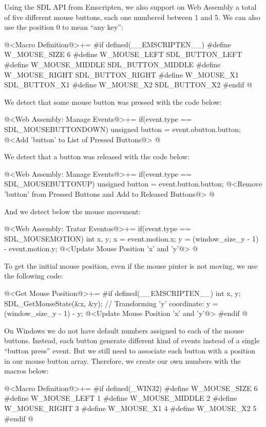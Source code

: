 
Using the SDL API from Emscripten, we also support on Web Assembly a
total of five different mouse buttons, each one numbered between 1 and
5. We can also use the position 0 to mean ``any key'':

\iniciocodigo
@<Macro Definition@>+=
#if defined(__EMSCRIPTEN__)
#define W_MOUSE_SIZE 6
#define W_MOUSE_LEFT   SDL_BUTTON_LEFT
#define W_MOUSE_MIDDLE SDL_BUTTON_MIDDLE
#define W_MOUSE_RIGHT  SDL_BUTTON_RIGHT
#define W_MOUSE_X1     SDL_BUTTON_X1
#define W_MOUSE_X2     SDL_BUTTON_X2
#endif
@
\fimcodigo

We detect that some mouse button was pressed with the code below:

\iniciocodigo
@<Web Assembly: Manage Events@>+=
if(event.type == SDL_MOUSEBUTTONDOWN){
  unsigned button = event.obutton.button;
  @<Add 'button' to List of Pressed Buttons@>
}
@
\fimcodigo

We detect that a button was released with the code below:

\iniciocodigo
@<Web Assembly: Manage Events@>+=
if(event.type == SDL_MOUSEBUTTONUP){
  unsigned button = event.button.button;
  @<Remove 'button' from Pressed Buttons and Add to Released Buttons@>
}
@
\fimcodigo

And we detect below the mouse movement:

\iniciocodigo
@<Web Assembly: Tratar Eventos@>+=
if(event.type == SDL_MOUSEMOTION){
  int x, y;
  x = event.motion.x;
  y = (window_size_y - 1) - event.motion.y;
  @<Update Mouse Position 'x' and 'y'@>
}
@
\fimcodigo

To get the initial mouse position, even if the mouse pinter is not
moving, we use the following code:

\iniciocodigo
@<Get Mouse Position@>+=
#if defined(__EMSCRIPTEN__)
{
  int x, y;
  SDL_GetMouseState(&x, &y);
  // Transforming 'y' coordinate:
  y = (window_size_y - 1) - y;
  @<Update Mouse Position 'x' and 'y'@>
}
#endif
@
\fimcodigo



On Windows we do not have default numbers assigned to each of the mouse
buttons. Instead, each button generate different kind of events
instead of a single ``button press'' event. But we still need to
associate each button with a position in our mouse button
array. Therefore, we create our own numbers with the macros below:

\iniciocodigo
@<Macro Definition@>+=
#if defined(_WIN32)
#define W_MOUSE_SIZE 6
#define W_MOUSE_LEFT   1
#define W_MOUSE_MIDDLE 2
#define W_MOUSE_RIGHT  3
#define W_MOUSE_X1     4
#define W_MOUSE_X2     5
#endif
@
\fimcodigo

